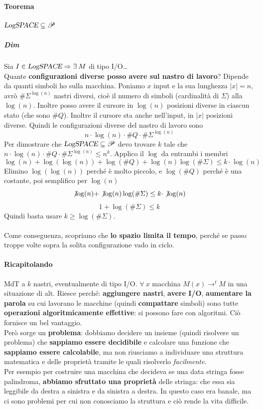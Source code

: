 \documentclass[10pt]{book}
\begin{document}
\paragraph{Teorema} $\textsl{LogSPACE} \subseteq \mathscr{P}$
\subparagraph{Dim} Sia $I \in \textsl{LogSPACE} \Rightarrow \exists\: M$ di tipo I/O\ldots\\
Quante \textbf{configurazioni diverse posso avere sul nastro di lavoro}? Dipende da quanti simboli ho sulla macchina. Poniamo $x$ input e la sua lunghezza $|x| = n$, avrò $\#\Sigma^{\log(n)}$ nastri diversi, cioè il numero di simboli (cardinalità di $\Sigma$) alla $\log (n)$. Inoltre posso avere il cursore in $\log(n)$ posizioni diverse in ciascun stato (che sono $\# Q$). Inoltre il cursore sta anche nell'input, in $|x|$ posizioni diverse. Quindi le configurazioni diverse del nastro di lavoro sono 
$$n\cdot\log(n)\cdot\# Q\cdot\#\Sigma^{\log(n)}$$
Per dimostrare che $\textsl{LogSPACE} \subseteq \mathscr{P}$ devo trovare $k$ tale che $n\cdot\log(n)\cdot\# Q\cdot\#\Sigma^{\log(n)} \leq n^k$. Applico il $\log$ da entrambi i membri
$$\log(n) + \log(\log(n)) + \log(\# Q) + \log(n)\log(\#\Sigma) \leq k\cdot\log(n)$$
Elimino $\log(\log(n))$ perché è molto piccolo, e $\log(\# Q)$ perché è una costante, poi semplifico per $\log(n)$
$$\not\log(n) + \not\log(n)\log(\#\Sigma) \leq k\cdot\not\log(n)$$
$$1 + \log(\#\Sigma) \leq k$$
Quindi basta usare $k \geq \log(\#\Sigma)$.\\\\
Come conseguenza, scopriamo che \textbf{lo spazio limita il tempo}, perché se passo troppe volte sopra la solita configurazione vado in ciclo.
\paragraph{Ricapitolando} MdT a $k$ nastri, eventualmente di tipo I/O. $\forall\:x$ macchina $M(x) \rightarrow^t M$ in una situazione di alt.
Riesce perché: \textbf{aggiungere nastri}, \textbf{avere I/O}, \textbf{aumentare la parola} su cui lavorano le macchine (quindi \textbf{compattare} simboli) sono tutte \textbf{operazioni algoritmicamente effettive}: si possono fare con algoritmi. Ciò fornisce un bel vantaggio.\\
Però sorge un \textbf{problema}: dobbiamo decidere un insieme (quindi risolvere un problema) che \textbf{sappiamo essere decidibile} e calcolare una funzione che \textbf{sappiamo essere calcolabile}, ma non riusciamo a individuare una struttura matematica e delle proprietà tramite le quali risolverlo \textit{facilmente}.\\
Per esempio per costruire una macchina che decideva se una data stringa fosse palindroma, \textbf{abbiamo sfruttato una proprietà} delle stringa: che essa sia leggibile da destra a sinistra e da sinistra a destra. In questo caso era banale, ma ci sono problemi per cui non conosciamo la struttura e ciò rende la vita difficile.
\end{document}
